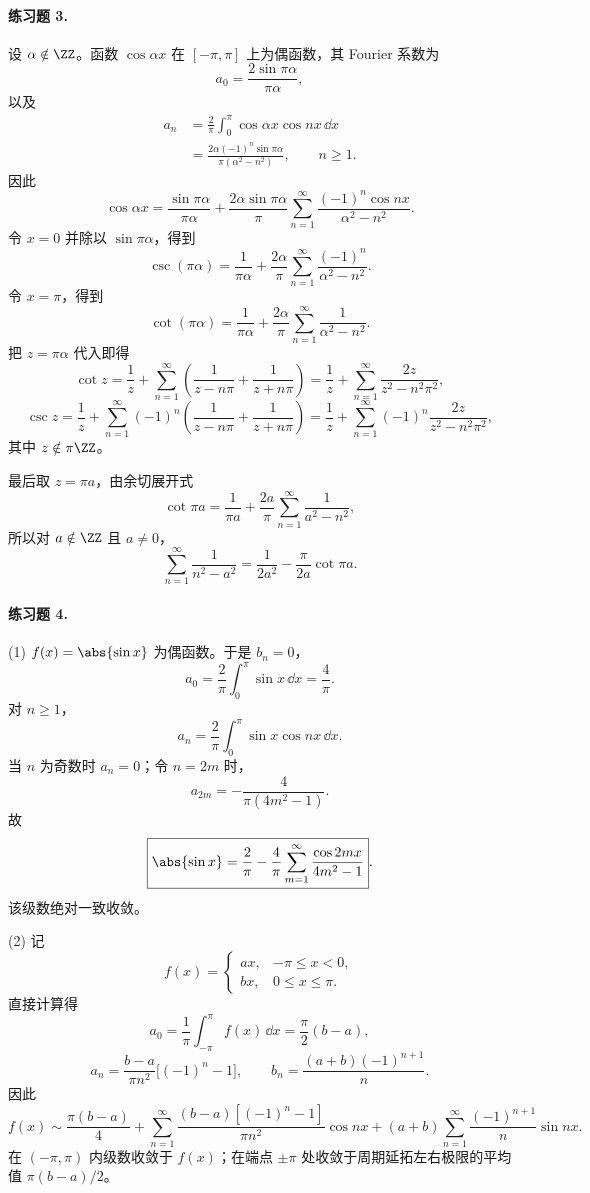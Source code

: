 \paragraph{练习题 3.}
\begin{xsolution}
设 $\alpha\notin\ZZ$。函数 $\cos\alpha x$ 在 $[-\pi,\pi]$ 上为偶函数，其 Fourier 系数为
\[
  a_0=\frac{2\sin\pi\alpha}{\pi\alpha},
\]
以及
\begin{align*}
  a_n
  &=\frac2\pi\int_0^\pi\cos\alpha x\cos nx\,\dd x\\
  &=\frac{2\alpha(-1)^n\sin\pi\alpha}{\pi(\alpha^2-n^2)},\qquad n\ge1.
\end{align*}
因此
\[
  \cos\alpha x
  =\frac{\sin\pi\alpha}{\pi\alpha}
  +\frac{2\alpha\sin\pi\alpha}{\pi}
  \sum_{n=1}^{\infty}\frac{(-1)^n\cos nx}{\alpha^2-n^2}.
\]
令 $x=0$ 并除以 $\sin\pi\alpha$，得到
\[
  \csc(\pi\alpha)
  =\frac1{\pi\alpha}
  +\frac{2\alpha}{\pi}
  \sum_{n=1}^{\infty}\frac{(-1)^n}{\alpha^2-n^2}.
\]
令 $x=\pi$，得到
\[
  \cot(\pi\alpha)
  =\frac1{\pi\alpha}
  +\frac{2\alpha}{\pi}
  \sum_{n=1}^{\infty}\frac1{\alpha^2-n^2}.
\]
把 $z=\pi\alpha$ 代入即得
\[
  \boxed{\displaystyle
  \cot z=\frac1z+\sum_{n=1}^{\infty}
  \left(\frac1{z-n\pi}+\frac1{z+n\pi}\right)
  =\frac1z+\sum_{n=1}^{\infty}\frac{2z}{z^2-n^2\pi^2}},
\]
\[
  \boxed{\displaystyle
  \csc z=\frac1z+\sum_{n=1}^{\infty}(-1)^n
  \left(\frac1{z-n\pi}+\frac1{z+n\pi}\right)
  =\frac1z+\sum_{n=1}^{\infty}(-1)^n\frac{2z}{z^2-n^2\pi^2}},
\]
其中 $z\notin\pi\ZZ$。

最后取 $z=\pi a$，由余切展开式
\[
  \cot\pi a=\frac1{\pi a}+\frac{2a}{\pi}
  \sum_{n=1}^{\infty}\frac1{a^2-n^2},
\]
所以对 $a\notin\ZZ$ 且 $a\ne0$，
\[
  \boxed{\displaystyle
  \sum_{n=1}^{\infty}\frac1{n^2-a^2}
  =\frac1{2a^2}-\frac{\pi}{2a}\cot\pi a }.
\]
\end{xsolution}

\paragraph{练习题 4.}
\begin{xsolution}
(1) $f(x)=\abs{\sin x}$ 为偶函数。于是 $b_n=0$，
\[
  a_0=\frac2\pi\int_0^\pi\sin x\,\dd x=\frac4\pi.
\]
对 $n\ge1$，
\[
  a_n=\frac2\pi\int_0^\pi\sin x\cos nx\,\dd x.
\]
当 $n$ 为奇数时 $a_n=0$；令 $n=2m$ 时，
\[
  a_{2m}=-\frac4{\pi(4m^2-1)}.
\]
故
\[
  \boxed{\displaystyle
  \abs{\sin x}=\frac{2}{\pi}-
  \frac{4}{\pi}
  \sum_{m=1}^{\infty}\frac{\cos2mx}{4m^2-1}}.
\]
该级数绝对一致收敛。

(2) 记
\[
  f(x)=\begin{cases}ax,&-\pi\le x<0,\\ bx,&0\le x\le\pi.\end{cases}
\]
直接计算得
\[
  a_0=\frac1\pi\int_{-\pi}^{\pi}f(x)\,\dd x
  =\frac\pi2(b-a),
\]
\[
  a_n=\frac{b-a}{\pi n^2}\bigl[(-1)^n-1\bigr],
\qquad
  b_n=\frac{(a+b)(-1)^{n+1}}n.
\]
因此
\[
  \boxed{\displaystyle
  f(x)\sim\frac{\pi(b-a)}4
  +\sum_{n=1}^{\infty}
   \frac{(b-a)[(-1)^n-1]}{\pi n^2}\cos nx
  +(a+b)\sum_{n=1}^{\infty}\frac{(-1)^{n+1}}n\sin nx }.
\]
在 $(-\pi,\pi)$ 内级数收敛于 $f(x)$；在端点 $\pm\pi$ 处收敛于周期延拓左右极限的平均值
$\pi(b-a)/2$。
\end{xsolution}

